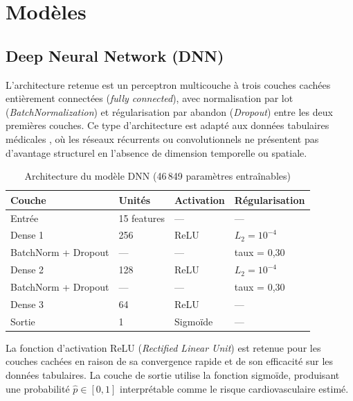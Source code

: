 \section{Modèles}

\subsection{Deep Neural Network (DNN)}

L'architecture retenue est un perceptron multicouche à trois couches cachées entièrement connectées (\textit{fully connected}), avec normalisation par lot (\textit{BatchNormalization}) et régularisation par abandon (\textit{Dropout}) entre les deux premières couches. Ce type d'architecture est adapté aux données tabulaires médicales \cite{shwartz2022}, où les réseaux récurrents ou convolutionnels ne présentent pas d'avantage structurel en l'absence de dimension temporelle ou spatiale.

\begin{table}[H]
\centering
\caption{Architecture du modèle DNN (46\,849 paramètres entraînables)}
\label{tab:dnn_arch}
\begin{tabular}{llll}
\toprule
\textbf{Couche} & \textbf{Unités} & \textbf{Activation} & \textbf{Régularisation} \\
\midrule
Entrée          & 15 features & ---     & --- \\
Dense 1         & 256         & ReLU    & $L_2 = 10^{-4}$ \\
BatchNorm + Dropout & ---     & ---     & taux = 0,30 \\
Dense 2         & 128         & ReLU    & $L_2 = 10^{-4}$ \\
BatchNorm + Dropout & ---     & ---     & taux = 0,30 \\
Dense 3         & 64          & ReLU    & --- \\
Sortie          & 1           & Sigmoïde & --- \\
\bottomrule
\end{tabular}
\end{table}

La fonction d'activation ReLU (\textit{Rectified Linear Unit}) est retenue pour les couches cachées en raison de sa convergence rapide et de son efficacité sur les données tabulaires. La couche de sortie utilise la fonction sigmoïde, produisant une probabilité $\hat{p} \in [0,1]$ interprétable comme le risque cardiovasculaire estimé.


